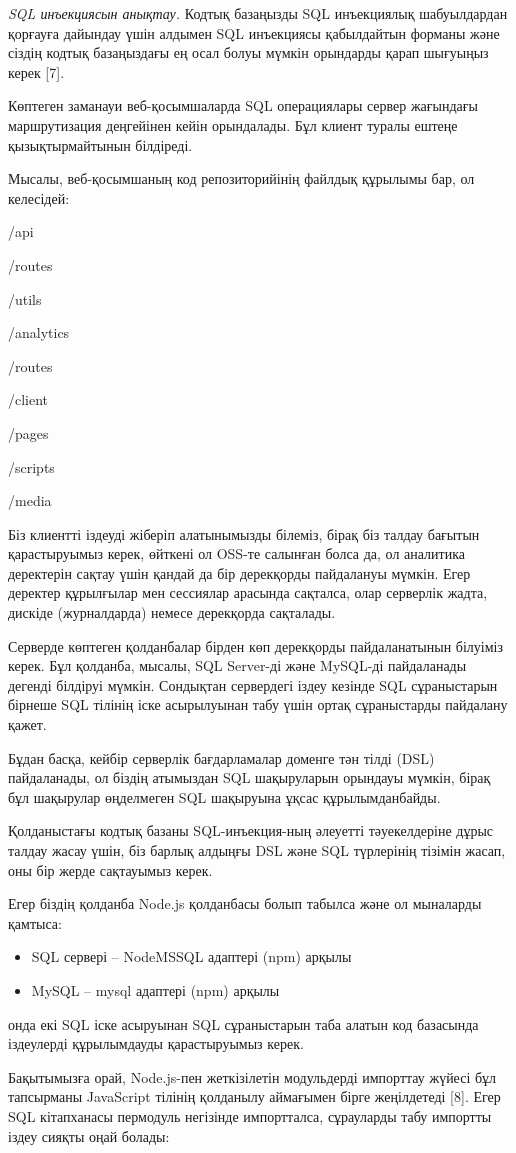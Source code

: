 \begin{multicols}{2}
\emph{SQL инъекциясын анықтау.} Кодтық базаңызды SQL инъекциялық
шабуылдардан қорғауға дайындау үшін алдымен SQL инъекциясы қабылдайтын
форманы және сіздің кодтық базаңыздағы ең осал болуы мүмкін орындарды
қарап шығуыңыз керек {[}7{]}.

Көптеген заманауи веб-қосымшаларда SQL операциялары сервер жағындағы
маршрутизация деңгейінен кейін орындалады. Бұл клиент туралы ештеңе
қызықтырмайтынын білдіреді.

Мысалы, веб-қосымшаның код репозиторийінің файлдық құрылымы бар, ол
келесідей:

/api

/routes

/utils

/analytics

/routes

/client

/pages

/scripts

/media

Біз клиентті іздеуді жіберіп алатынымызды білеміз, бірақ біз талдау
бағытын қарастыруымыз керек, өйткені ол OSS-те салынған болса да, ол
аналитика деректерін сақтау үшін қандай да бір дерекқорды пайдалануы
мүмкін. Егер деректер құрылғылар мен сессиялар арасында сақталса, олар
серверлік жадта, дискіде (журналдарда) немесе дерекқорда сақталады.

Серверде көптеген қолданбалар бірден көп дерекқорды пайдаланатынын
білуіміз керек. Бұл қолданба, мысалы, SQL Server-ді және MySQL-ді
пайдаланады дегенді білдіруі мүмкін. Сондықтан сервердегі іздеу кезінде
SQL сұраныстарын бірнеше SQL тілінің іске асырылуынан табу үшін ортақ
сұраныстарды пайдалану қажет.

Бұдан басқа, кейбір серверлік бағдарламалар доменге тән тілді (DSL)
пайдаланады, ол біздің атымыздан SQL шақыруларын орындауы мүмкін, бірақ
бұл шақырулар өңделмеген SQL шақыруына ұқсас құрылымданбайды.

Қолданыстағы кодтық базаны SQL-инъекция-ның әлеуетті тәуекелдеріне дұрыс
талдау жасау үшін, біз барлық алдыңғы DSL және SQL түрлерінің тізімін
жасап, оны бір жерде сақтауымыз керек.

Егер біздің қолданба Node.js қолданбасы болып табылса және ол мыналарды
қамтыса:

\begin{itemize}
  \setlength{\itemindent}{1cm} 
\item
  SQL сервері -- NodeMSSQL адаптері (npm) арқылы
\item
  MySQL -- mysql адаптері (npm) арқылы
\end{itemize}

онда екі SQL іске асыруынан SQL сұраныстарын таба алатын код базасында
іздеулерді құрылымдауды қарастыруымыз керек.

Бақытымызға орай, Node.js-пен жеткізілетін модульдерді импорттау жүйесі
бұл тапсырманы JavaScript тілінің қолданылу аймағымен бірге жеңілдетеді
{[}8{]}. Егер SQL кітапханасы пермодуль негізінде импортталса,
сұрауларды табу импортты іздеу сияқты оңай болады:
\end{multicols}

